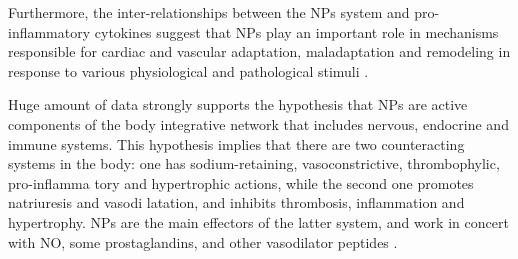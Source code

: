 \documentclass[14pt,a4paper,onecolumn]{extarticle}
\begin{document}



Furthermore, the inter-relationships between the NPs system and pro-inflammatory cytokines suggest that NPs play an important role in mechanisms responsible for cardiac and vascular adaptation, maladaptation and remodeling in response to various physiological and pathological stimuli \citep{32} \citep{35}.


Huge amount of data strongly supports the hypothesis that NPs are active components of the body integrative network that includes nervous, endocrine and immune systems. This hypothesis implies that there are two counteracting systems in the body: one has sodium-retaining, vasoconstrictive, thrombophylic, pro-inflamma tory and hypertrophic actions, while the second one promotes natriuresis and vasodi latation, and inhibits thrombosis, inflammation and hypertrophy. NPs are the main effectors of the latter system, and work in concert with NO, some prostaglandins, and other vasodilator peptides \citep{120}.
\end{document}
